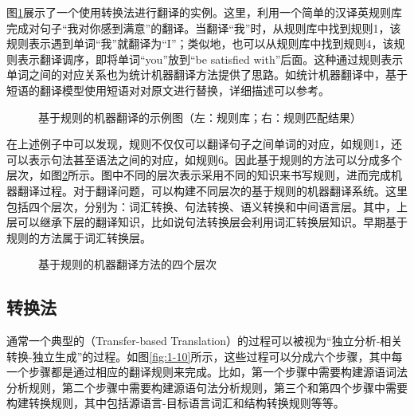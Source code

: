 \parinterval 图\ref{fig:1-8}展示了一个使用转换法进行翻译的实例。这里，利用一个简单的汉译英规则库完成对句子“我对你感到满意”的翻译。当翻译“我”时，从规则库中找到规则1，该规则表示遇到单词“我”就翻译为“I”；类似地，也可以从规则库中找到规则4，该规则表示翻译调序，即将单词“you”放到“be satisfied with”后面。这种通过规则表示单词之间的对应关系也为统计机器翻译方法提供了思路。如统计机器翻译中，基于短语的翻译模型使用短语对对原文进行替换，详细描述可以参考{\chapterseven}。

\begin{figure}[htp]
    \centering

    \caption{基于规则的机器翻译的示例图（左：规则库；右：规则匹配结果）}
    \label{fig:1-8}
\end{figure}

\parinterval 在上述例子中可以发现，规则不仅仅可以翻译句子之间单词的对应，如规则1，还可以表示句法甚至语法之间的对应，如规则6。因此基于规则的方法可以分成多个层次，如图\ref{fig:1-9}所示。图中不同的层次表示采用不同的知识来书写规则，进而完成机器翻译过程。对于翻译问题，可以构建不同层次的基于规则的机器翻译系统。这里包括四个层次，分别为：词汇转换、句法转换、语义转换和中间语言层。其中，上层可以继承下层的翻译知识，比如说句法转换层会利用词汇转换层知识。早期基于规则的方法属于词汇转换层。

\begin{figure}[htp]
    \centering

    \caption{基于规则的机器翻译方法的四个层次}
\setlength{\belowcaptionskip}{-1.5em}
    \label{fig:1-9}
\end{figure}


\subsection{转换法}

\parinterval 通常一个典型的{\small{}}（Transfer-based Translation）的过程可以被视为“独立分析-相关转换-独立生成”的过程。如图\ref{fig:1-10}所示，这些过程可以分成六个步骤，其中每一个步骤都是通过相应的翻译规则来完成。比如，第一个步骤中需要构建源语词法分析规则，第二个步骤中需要构建源语句法分析规则，第三个和第四个步骤中需要构建转换规则，其中包括源语言-目标语言词汇和结构转换规则等等。

